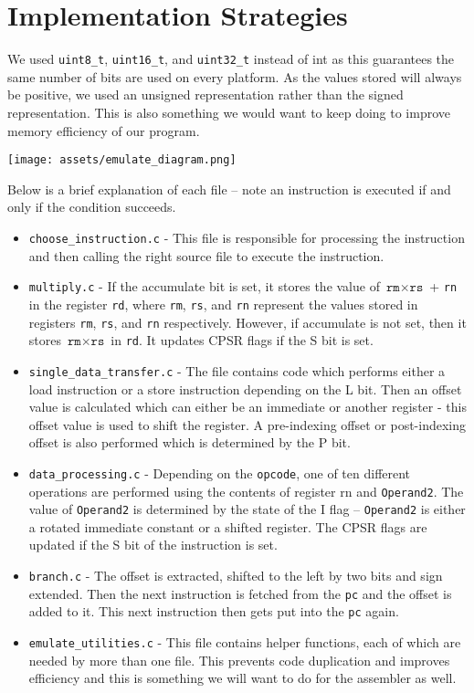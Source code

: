 \documentclass[11pt]{article}
\begin{document}
\section{Implementation Strategies}

We used \texttt{uint8\_t}, \texttt{uint16\_t}, and \texttt{uint32\_t} instead of int as this guarantees the same number of bits are used on every platform. As the values stored will always be positive, we used an unsigned representation rather than the signed representation. This is also something we would want to keep doing to improve memory efficiency of our program. 

\begin{center}
    \texttt{[image: assets/emulate\_diagram.png]}
\end{center}

Below is a brief explanation of each file – note an instruction is executed if and only if the condition succeeds. 
\begin{itemize}
    \item \texttt{choose\_instruction.c} - This file is responsible for processing the instruction and then calling the right source file to execute the instruction. 
    \item \texttt{multiply.c} - If the accumulate bit is set, it stores the value of $\texttt{rm} \times \texttt{rs}$ + \texttt{rn} in the register \texttt{rd}, where \texttt{rm}, \texttt{rs}, and \texttt{rn} represent the values stored in registers \texttt{rm}, \texttt{rs}, and \texttt{rn} respectively. However, if accumulate is not set, then it stores $\texttt{rm} \times \texttt{rs}$ in \texttt{rd}. It updates CPSR flags if the S bit is set. 
    \item \texttt{single\_data\_transfer.c} - The file contains code which performs either a load instruction or a store instruction depending on the L bit. Then an offset value is calculated which can either be an immediate or another register - this offset value is used to shift the register. A pre-indexing offset or post-indexing offset is also performed which is determined by the P bit. 
    \item \texttt{data\_processing.c} - Depending on the \texttt{opcode}, one of ten different operations are performed using the contents of register rn and \texttt{Operand2}. The value of \texttt{Operand2} is determined by the state of the I flag – \texttt{Operand2} is either a rotated immediate constant or a shifted register. The CPSR flags are updated if the S bit of the instruction is set. 
    \item \texttt{branch.c} - The offset is extracted, shifted to the left by two bits and sign extended. Then the next instruction is fetched from the \texttt{pc} and the offset is added to it. This next instruction then gets put into the \texttt{pc} again. 
    \item \texttt{emulate\_utilities.c} - This file contains helper functions, each of which are needed by more than one file. This prevents code duplication and improves efficiency and this is something we will want to do for the assembler as well. 
    
\end{itemize}
\end{document}
